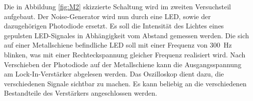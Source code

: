 Die in Abbildung \ref{fig:M2} skizzierte Schaltung wird im zweiten Versuchsteil aufgebaut. 
Der Noise-Generator wird nun durch eine LED, sowie der dazugehörigen Photodiode ersetzt. 
Es soll die Intensität des Lichtes eines gepulsten LED-Signales in Abhängigkeit vom Abstand gemessen werden.
Die sich auf einer Metallschiene befindliche LED soll mit einer Frequenz von \SI{300}{\hertz} blinken, was mit einer Rechteckspannung gleicher Frequenz realisiert wird. 
Nach Verschieben der Photodiode auf der Metallschiene kann die Ausgangsspannung am Lock-In-Verstärker abgelesen werden.
Das Oszilloskop dient dazu, die verschiedenen Signale sichtbar zu machen. 
Es kann beliebig an die verschiedenen Bestandteile des Verstärkers angeschlossen werden. 
